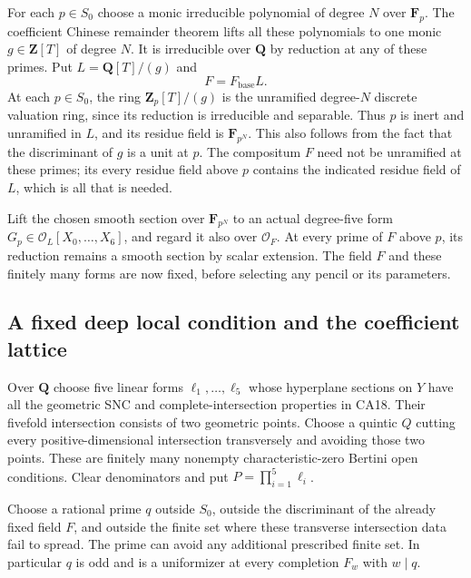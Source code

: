 For each $p\in S_0$ choose a monic irreducible polynomial of
degree $N$ over $\mathbf F_p$.  The coefficient Chinese
remainder theorem lifts all these polynomials to one monic
$g\in\mathbf Z[T]$ of degree $N$.
It is irreducible over $\mathbf Q$ by reduction at any of
these primes.  Put $L=\mathbf Q[T]/(g)$ and
\[
                              F=F_{\mathrm{base}}L.
 \tag{CG18.4}\label{r18cg:field}
\]
At each $p\in S_0$, the ring $\mathbf Z_p[T]/(g)$ is the
unramified degree-$N$ discrete valuation ring, since its
reduction is irreducible and separable.  Thus $p$ is inert
and unramified in $L$, and its residue field is
$\mathbf F_{p^N}$.  This also follows from the fact that
the discriminant of $g$ is a unit at $p$.
The compositum $F$ need not be unramified at these primes;
its every residue field above $p$ contains the indicated
residue field of $L$, which is all that is needed.

Lift the chosen smooth section over $\mathbf F_{p^N}$ to
an actual degree-five form $G_p\in\mathcal O_L[X_0,\ldots,X_6]$,
and regard it also over $\mathcal O_F$.
At every prime of $F$ above $p$, its reduction remains a
smooth section by scalar extension.
The field $F$ and these finitely many forms are now fixed,
before selecting any pencil or its parameters.

\subsection{A fixed deep local condition and the coefficient lattice}

Over $\mathbf Q$ choose five linear forms
$\ell_1,\ldots,\ell_5$ whose hyperplane sections on $Y$
have all the geometric SNC and complete-intersection
properties in CA18.  Their fivefold intersection consists
of two geometric points.  Choose a quintic $Q$ cutting
every positive-dimensional intersection transversely and
avoiding those two points.  These are finitely many
nonempty characteristic-zero Bertini open conditions.
Clear denominators and put $P=\prod_{i=1}^5\ell_i$.

Choose a rational prime $q$ outside $S_0$, outside the
discriminant of the already fixed field $F$, and outside
the finite set where these transverse intersection data
fail to spread.  The prime can avoid any additional
prescribed finite set.  In particular $q$ is odd and is
a uniformizer at every completion $F_w$ with $w\mid q$.

